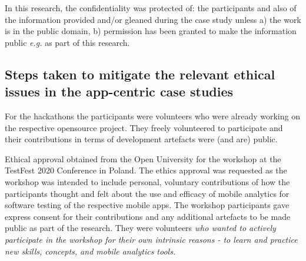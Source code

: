



In this research, the confidentiality was protected of: the participants and also of the information provided and/or gleaned during the case study unless a) the work is in the public domain, b) permission has been granted to make the information public \textit{e.g.} as part of this research.

\subsection{Steps taken to mitigate the relevant ethical issues in the app-centric case studies}
For the hackathons the participants were volunteers who were already working on the respective opensource project. They freely volunteered to participate and their contributions in terms of development artefacts were (and are) public. 

Ethical approval obtained from the Open University for the workshop at the TestFest 2020 Conference in Poland. The ethics approval was requested as the workshop was intended to include personal, voluntary contributions of how the participants thought and felt about the use and efficacy of mobile analytics for software testing of the respective mobile apps. The workshop participants gave express consent for their contributions and any additional artefacts to be made public as part of the research. They were volunteers \textit{who wanted to actively participate in the workshop for their own intrinsic reasons - to learn and practice new skills, concepts, and mobile analytics tools.}

